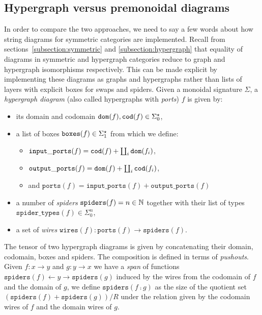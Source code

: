 \subsection{Hypergraph versus premonoidal diagrams}\label{subsection:hypergraph-vs-premonoidal}

In order to compare the two approaches, we need to say a few words about how string diagrams for symmetric categories are implemented.
Recall from sections~\ref{subsection:symmetric} and \ref{subsection:hypergraph} that equality of diagrams in symmetric and hypergraph categories reduce to graph and hypergraph isomorphisms respectively.
This can be made explicit by implementing these diagrams as graphs and hypergraphs rather than lists of layers with explicit boxes for swaps and spiders.
Given a monoidal signature $\Sigma$, a \emph{hypergraph diagram} (also called hypergraphs with \emph{ports}) $f$ is given by:
\begin{itemize}
\item its domain and codomain $\mathtt{dom}(f), \mathtt{cod}(f) \in \Sigma_0^\star$,
\item a list of boxes $\mathtt{boxes}(f) \in \Sigma_1^\star$ from which we define:
\begin{itemize}
    \item $\mathtt{input\_ports}(f) = \mathtt{cod}(f) + \coprod_i \mathtt{dom}(f_i)$,
    \item $\mathtt{output\_ports}(f) = \mathtt{dom}(f) + \coprod_i \mathtt{cod}(f_i)$,
    \item and $\mathtt{ports}(f) = \mathtt{input\_ports}(f) + \mathtt{output\_ports}(f)$
\end{itemize}
\item a number of \emph{spiders} $\mathtt{spiders}(f) = n \in \mathbb{N}$ together with their list of types $\mathtt{spider\_types}(f) \in \Sigma_0^{n}$,
\item a set of \emph{wires} $\mathtt{wires}(f) : \mathtt{ports}(f) \to \mathtt{spiders}(f)$.
\end{itemize}
The tensor of two hypergraph diagrams is given by concatenating their domain, codomain, boxes and spiders.
The composition is defined in terms of \emph{pushouts}.
Given $f : x \to y$ and $g : y \to x$ we have a \emph{span} of functions $\mathtt{spiders}(f) \leftarrow y \rightarrow \mathtt{spiders}(g)$ induced by the wires from the codomain of $f$ and the domain of $g$, we define $\mathtt{spiders}(f \fcmp g)$ as the size of the quotient set $(\mathtt{spiders}(f) + \mathtt{spiders}(g)) / R$ under the relation given by the codomain wires of $f$ and the domain wires of $g$.
